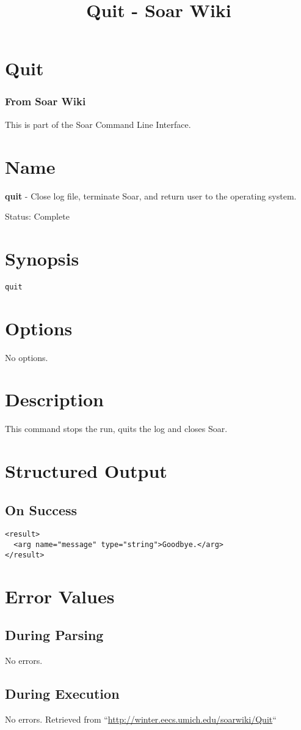\documentclass[10pt]{article}
\title{Quit - Soar Wiki}
\begin{document}
\section*{Quit}
\subsubsection*{From Soar Wiki}


 This is part of the Soar Command Line Interface. 
\section*{ Name }


 \textbf{quit}
 - Close log file, terminate Soar, and return user to the operating system. 


 Status: Complete
\section*{ Synopsis }
\begin{verbatim}
quit

\end{verbatim}
\section*{ Options }


 No options. 
\section*{ Description }


 This command stops the run, quits the log and closes Soar. 
\section*{ Structured Output }
\subsection*{ On Success }
\begin{verbatim}
<result>
  <arg name="message" type="string">Goodbye.</arg>
</result>

\end{verbatim}
\section*{ Error Values }
\subsection*{ During Parsing }


 No errors. 
\subsection*{ During Execution }


 No errors.  Retrieved from ``\url{http://winter.eecs.umich.edu/soarwiki/Quit}``
\end{document}

